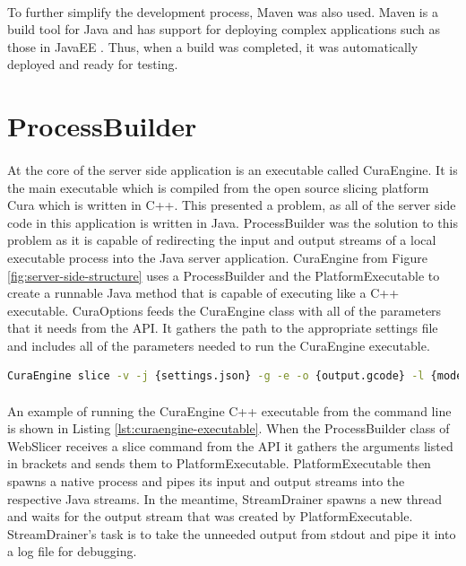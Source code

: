 \paragraph{}
To further simplify the development process, Maven was also used.
Maven is a build tool for Java and has support for deploying complex applications such as those in JavaEE \citep{massol-2005}.
Thus, when a build was completed, it was automatically deployed and ready for testing.

\section{ProcessBuilder}
\paragraph{}
At the core of the server side application is an executable called CuraEngine. 
It is the main executable which is compiled from the open source slicing platform Cura which is written in C++. 
This presented a problem, as all of the server side code in this application is written in Java. 
ProcessBuilder was the solution to this problem as it is capable of redirecting the input and output streams of a local executable process into the Java server application.
CuraEngine from Figure \ref{fig:server-side-structure} uses a ProcessBuilder and the PlatformExecutable to create a runnable Java method that is capable of executing like a C++ executable.
CuraOptions feeds the CuraEngine class with all of the parameters that it needs from the API.
It gathers the path to the appropriate settings file and includes all of the parameters needed to run the CuraEngine executable.

\begin{lstlisting}[language=sh, label={lst:curaengine-executable}, caption=An example of running CuraEngine C++ executable directly from the command line.]
CuraEngine slice -v -j {settings.json} -g -e -o {output.gcode} -l {model-file.stl}
\end{lstlisting}

\paragraph{}
An example of running the CuraEngine C++ executable from the command line is shown in Listing \ref{lst:curaengine-executable}.
When the ProcessBuilder class of WebSlicer receives a slice command from the API it gathers the arguments listed in brackets and sends them to PlatformExecutable.
PlatformExecutable then spawns a native process and pipes its input and output streams into the respective Java streams.
In the meantime, StreamDrainer spawns a new thread and waits for the output stream that was created by PlatformExecutable.
StreamDrainer's task is to take the unneeded output from stdout and pipe it into a log file for debugging.

